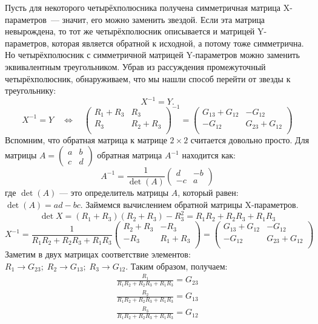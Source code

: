 \documentclass[11pt,a4paper]{article}
\begin{document}
Пусть для некоторого четырёхполюсника
получена симметричная матрица X-параметров~--- значит, его можно заменить
звездой. Если эта матрица невырождена, то тот же четырёхполюсник
описывается и матрицей Y-параметров, которая является обратной к
исходной, а потому тоже симметрична. Но четырёхполюсник с симметричной
матрицей Y-параметров можно заменить эквивалентным треугольником. Убрав
из рассуждения промежуточный четырёхполюсник, обнаруживаем, что мы нашли
способ перейти от звезды к треугольнику:
\[
    X^{-1} = Y .
\]
$$
X^{-1} = Y \quad \Leftrightarrow \quad
\begin{pmatrix}
R_1 + R_3 & R_3 \\ R_3 & R_2 + R_3\\
\end{pmatrix}^{-1}
=
\begin{pmatrix}
G_{13} + G_{12} & -G_{12} \\ -G_{12} & G_{23}+G_{12}\\
\end{pmatrix}
$$
Вспомним, что обратная матрица к матрице $2\times2$ считается довольно просто.
Для матрицы $A = \begin{pmatrix} a & b \\ c & d \end{pmatrix}$ обратная матрица $A^{-1}$ находится как: 
$$A^{-1} = \frac{1}{\det(A)} \begin{pmatrix} d & -b \\ -c & a \end{pmatrix}$$
где $\det(A)$ — это определитель матрицы $A$, который равен: $\det(A) = ad - bc$.
Займемся вычислением обратной матрицы X-параметров.
$$
\det X = (R_1 + R_3)(R_2+R_3) - R_3^2 = R_1R_2 + R_2R_3+R_1R_3
$$
$$
X^{-1} = \frac{1}{R_1R_2 + R_2R_3+R_1R_3}
\begin{pmatrix}
R_2 + R_3 & -R_3 \\ -R_3 & R_1 + R_3\\
\end{pmatrix}
=
\begin{pmatrix}
G_{13} + G_{12} & -G_{12} \\ -G_{12} & G_{23}+G_{12}\\
\end{pmatrix}
$$
Заметим в двух матрицах соответствие элементов: $R_1 \rightarrow G_{23};\; R_2 \rightarrow 
G_{13};\; R_3 \rightarrow G_{12}$.
Таким образом, получаем:
$$
\begin{array}{l}
\frac{R_1}{R_1R_2 + R_2R_3+R_1R_3} = G_{23} \\
\frac{R_2}{R_1R_2 + R_2R_3+R_1R_3} = G_{13} \\
\frac{R_3}{R_1R_2 + R_2R_3+R_1R_3} = G_{12} \\
\end{array}
$$
\end{document}
